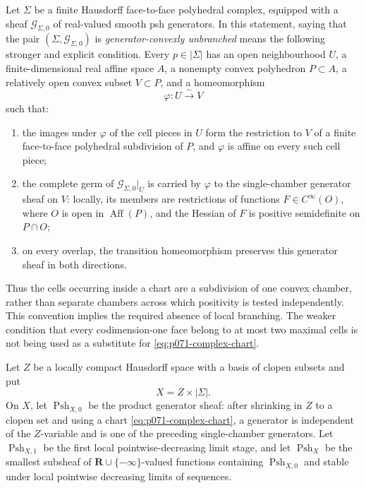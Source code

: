 
Let \(\Sigma\) be a finite Hausdorff face-to-face polyhedral complex,
equipped with a sheaf \(\mathcal G_{\Sigma,0}\) of real-valued smooth psh
generators.  In this statement, saying that the pair
\((\Sigma,\mathcal G_{\Sigma,0})\) is \emph{generator-convexly unbranched}
means the following stronger and explicit condition.  Every
\(p\in|\Sigma|\) has an open neighbourhood \(U\), a finite-dimensional real
affine space \(A\), a nonempty convex polyhedron \(P\subset A\), a relatively
open convex subset \(V\subset P\), and a homeomorphism
\begin{equation}
                         \varphi:U\xrightarrow{\sim}V
 \label{eq:p071-complex-chart}
\end{equation}
such that:
\begin{enumerate}
\item the images under \(\varphi\) of the cell pieces in \(U\) form the
  restriction to \(V\) of a finite face-to-face polyhedral subdivision of
  \(P\), and \(\varphi\) is affine on every such cell piece;
\item the complete germ of \(\mathcal G_{\Sigma,0}|_U\) is carried by
  \(\varphi\) to the single-chamber generator sheaf on
  \(V\): locally, its members are restrictions of functions
  \(F\in C^\infty(O)\), where \(O\) is open in
  \(\operatorname{Aff}(P)\), and the Hessian of \(F\) is positive
  semidefinite on \(P\cap O\);
\item on every overlap, the transition homeomorphism preserves this
  generator sheaf in both directions.
\end{enumerate}
Thus the cells occurring inside a chart are a subdivision of one convex
chamber, rather than separate chambers across which positivity is tested
independently.  This convention implies the required absence of local
branching.  The weaker condition that every codimension-one face belong to
at most two maximal cells is not being used as a substitute for
\eqref{eq:p071-complex-chart}.

Let \(Z\) be a locally compact Hausdorff space with a basis of clopen
subsets and put
\[
                              X=Z\times|\Sigma|.
\]
On \(X\), let \(\operatorname{Psh}_{X,0}\) be the product generator sheaf:
after shrinking in \(Z\) to a clopen set and using a chart
\eqref{eq:p071-complex-chart}, a generator is independent of the
\(Z\)-variable and is one of the preceding single-chamber generators.
Let \(\operatorname{Psh}_{X,1}\) be the first local pointwise-decreasing
limit stage, and let \(\operatorname{Psh}_X\) be the smallest subsheaf of
\(\mathbf R\cup\{-\infty\}\)-valued functions containing
\(\operatorname{Psh}_{X,0}\) and stable under local pointwise decreasing
limits of sequences.

